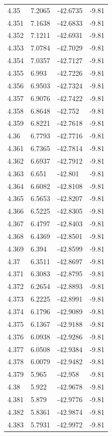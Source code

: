 \begin{tabular}{llll}
4.35 & 7.2065 & -42.6735 & -9.81 \\
4.351 & 7.1638 & -42.6833 & -9.81 \\
4.352 & 7.1211 & -42.6931 & -9.81 \\
4.353 & 7.0784 & -42.7029 & -9.81 \\
4.354 & 7.0357 & -42.7127 & -9.81 \\
4.355 & 6.993 & -42.7226 & -9.81 \\
4.356 & 6.9503 & -42.7324 & -9.81 \\
4.357 & 6.9076 & -42.7422 & -9.81 \\
4.358 & 6.8648 & -42.752 & -9.81 \\
4.359 & 6.8221 & -42.7618 & -9.81 \\
4.36 & 6.7793 & -42.7716 & -9.81 \\
4.361 & 6.7365 & -42.7814 & -9.81 \\
4.362 & 6.6937 & -42.7912 & -9.81 \\
4.363 & 6.651 & -42.801 & -9.81 \\
4.364 & 6.6082 & -42.8108 & -9.81 \\
4.365 & 6.5653 & -42.8207 & -9.81 \\
4.366 & 6.5225 & -42.8305 & -9.81 \\
4.367 & 6.4797 & -42.8403 & -9.81 \\
4.368 & 6.4369 & -42.8501 & -9.81 \\
4.369 & 6.394 & -42.8599 & -9.81 \\
4.37 & 6.3511 & -42.8697 & -9.81 \\
4.371 & 6.3083 & -42.8795 & -9.81 \\
4.372 & 6.2654 & -42.8893 & -9.81 \\
4.373 & 6.2225 & -42.8991 & -9.81 \\
4.374 & 6.1796 & -42.9089 & -9.81 \\
4.375 & 6.1367 & -42.9188 & -9.81 \\
4.376 & 6.0938 & -42.9286 & -9.81 \\
4.377 & 6.0508 & -42.9384 & -9.81 \\
4.378 & 6.0079 & -42.9482 & -9.81 \\
4.379 & 5.965 & -42.958 & -9.81 \\
4.38 & 5.922 & -42.9678 & -9.81 \\
4.381 & 5.879 & -42.9776 & -9.81 \\
4.382 & 5.8361 & -42.9874 & -9.81 \\
4.383 & 5.7931 & -42.9972 & -9.81 \\

\end{tabular}
